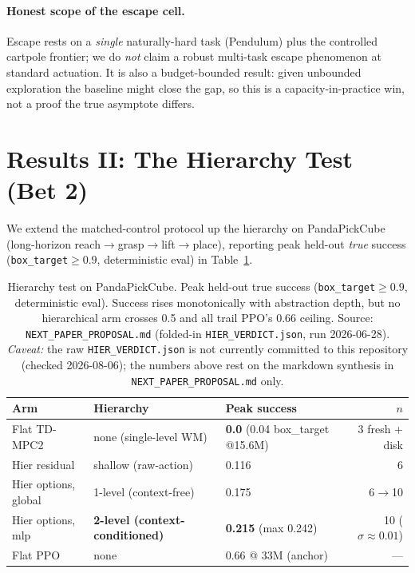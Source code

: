 \documentclass{article}
\begin{document}
\paragraph{Honest scope of the escape cell.}
Escape rests on a \emph{single} naturally-hard task (Pendulum) plus the controlled
cartpole frontier; we do \emph{not} claim a robust multi-task escape phenomenon at
standard actuation. It is also a budget-bounded result: given unbounded
exploration the baseline might close the gap, so this is a capacity-in-practice
win, not a proof the true asymptote differs.

\section{Results II: The Hierarchy Test (Bet 2)}
\label{sec:results-hier}

We extend the matched-control protocol up the hierarchy on PandaPickCube
(long-horizon reach$\to$grasp$\to$lift$\to$place), reporting peak held-out
\emph{true} success (\texttt{box\_target}$\geq 0.9$, deterministic eval) in
Table~\ref{tab:hier}.

\begin{table}[t]
\centering
\caption{Hierarchy test on PandaPickCube. Peak held-out true success
(\texttt{box\_target}$\geq 0.9$, deterministic eval). Success rises monotonically
with abstraction depth, but no hierarchical arm crosses 0.5 and all trail PPO's
0.66 ceiling. Source: \texttt{NEXT\_PAPER\_PROPOSAL.md} (folded-in
\texttt{HIER\_VERDICT.json}, run 2026-06-28). \emph{Caveat:} the raw
\texttt{HIER\_VERDICT.json} is not currently committed to this repository
(checked 2026-08-06); the numbers above rest on the markdown synthesis in
\texttt{NEXT\_PAPER\_PROPOSAL.md} only.}
\label{tab:hier}
\begin{tabular}{lllr}
\toprule
Arm & Hierarchy & Peak success & $n$ \\
\midrule
Flat TD-MPC2          & none (single-level WM)            & \textbf{0.0} (0.04 box\_target @15.6M) & 3 fresh + disk \\
Hier residual         & shallow (raw-action)              & 0.116 & 6 \\
Hier options, global  & 1-level (context-free)            & 0.175 & 6$\to$10 \\
Hier options, mlp     & \textbf{2-level (context-conditioned)} & \textbf{0.215} (max 0.242) & 10 ($\sigma{\approx}0.01$) \\
Flat PPO              & none                              & 0.66 @ 33M (anchor) & --- \\
\bottomrule
\end{tabular}
\end{table}
\end{document}
